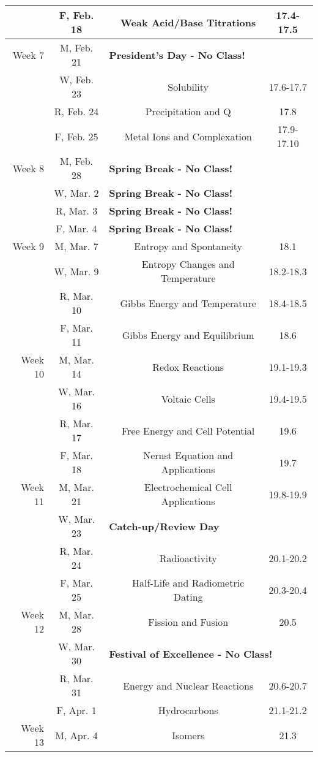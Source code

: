 \begin{tabular}{rcccc}
& F, Feb. 18&& Weak Acid/Base Titrations & 17.4-17.5\\
\midrule
Week 7 & M, Feb. 21& \multicolumn{3}{l}{\textbf{President's Day - No Class!}}\\
& W, Feb. 23&& Solubility & 17.6-17.7\\
& R, Feb. 24&& Precipitation and Q & 17.8\\
& F, Feb. 25&& Metal Ions and Complexation & 17.9-17.10\\
\midrule
Week 8 & M, Feb. 28& \multicolumn{3}{l}{\textbf{Spring Break - No Class!}}\\
& W, Mar. 2& \multicolumn{3}{l}{\textbf{Spring Break - No Class!}}\\
& R, Mar. 3& \multicolumn{3}{l}{\textbf{Spring Break - No Class!}}\\
& F, Mar. 4& \multicolumn{3}{l}{\textbf{Spring Break - No Class!}}\\
\midrule
Week 9 & M, Mar. 7&& Entropy and Spontaneity & 18.1\\
& W, Mar. 9&& Entropy Changes and Temperature & 18.2-18.3\\
& R, Mar. 10&& Gibbs Energy and Temperature & 18.4-18.5\\
& F, Mar. 11&& Gibbs Energy and Equilibrium & 18.6\\
\midrule
Week 10 & M, Mar. 14&& Redox Reactions & 19.1-19.3\\
& W, Mar. 16&& Voltaic Cells & 19.4-19.5\\
& R, Mar. 17&& Free Energy and Cell Potential & 19.6\\
& F, Mar. 18&& Nernst Equation and Applications & 19.7\\
\midrule
Week 11 & M, Mar. 21&& Electrochemical Cell Applications & 19.8-19.9\\
& W, Mar. 23& \multicolumn{3}{l}{\textbf{Catch-up/Review Day}}\\
& R, Mar. 24&& Radioactivity & 20.1-20.2\\
& F, Mar. 25&& Half-Life and Radiometric Dating & 20.3-20.4\\
\midrule
Week 12 & M, Mar. 28&& Fission and Fusion & 20.5\\
& W, Mar. 30& \multicolumn{3}{l}{\textbf{Festival of Excellence - No Class!}}\\
& R, Mar. 31&& Energy and Nuclear Reactions & 20.6-20.7\\
& F, Apr. 1&& Hydrocarbons & 21.1-21.2\\
\midrule
Week 13 & M, Apr. 4&& Isomers & 21.3\\

\end{tabular}
